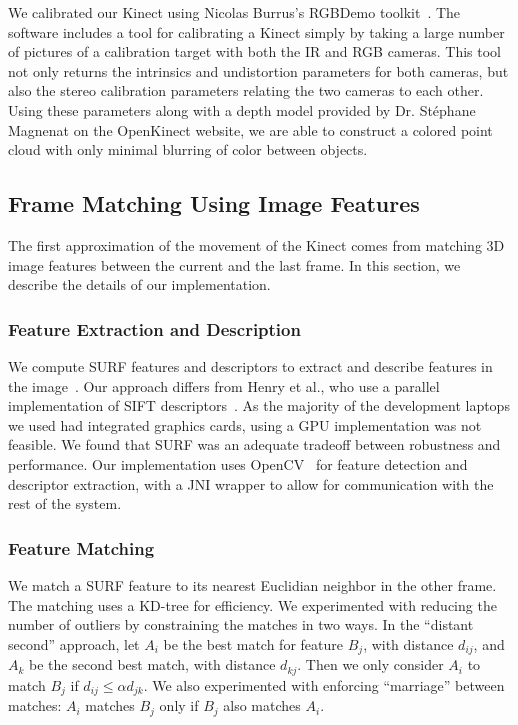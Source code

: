 \documentclass[letterpaper, 10pt, conference]{ieeeconf}
\begin{document}
We calibrated our Kinect using Nicolas Burrus's RGBDemo
toolkit~\cite{BurrusCalibration}. The software includes a tool for calibrating
a Kinect simply by taking a large number of pictures of a calibration target
with both the IR and RGB cameras. This tool not only returns the intrinsics
and undistortion parameters for both cameras, but also the stereo calibration
parameters relating the two cameras to each other. Using these parameters
along with a depth model provided by Dr. St\'{e}phane Magnenat on the
OpenKinect website, we are able to construct a colored point cloud with only
minimal blurring of color between objects.

\subsection{Frame Matching Using Image Features}
The first approximation of the movement of the Kinect comes from matching 3D image
features between the current and the last frame. In this section, we describe the details
of our implementation.

\subsubsection{Feature Extraction and Description}
We compute SURF features and descriptors
to extract and describe features in the image~\cite{Bay06surf}. Our approach differs
from Henry et al., who use a parallel implementation of SIFT descriptors~\cite{SIFTGPU}.
As the majority of the development laptops we used had integrated graphics cards, using
a GPU implementation was not feasible. We found that SURF was an adequate tradeoff
between robustness and performance. Our implementation uses OpenCV~\cite{opencv_library}
for feature detection and descriptor extraction, with a JNI wrapper to allow for
communication with the rest of the system.

\subsubsection{Feature Matching}
We match a SURF feature to its nearest Euclidian neighbor in the other frame. The matching
uses a KD-tree for efficiency. We experimented with reducing the number of outliers by
constraining the matches in two ways. In the ``distant second'' approach, let $A_i$ be the
best match for feature $B_j$, with distance $d_{ij}$, and $A_k$ be the second best match,
with distance $d_{kj}$. Then we only consider $A_i$ to match $B_j$ if $d_{ij} \le \alpha d_{jk}$.
We also experimented with enforcing ``marriage'' between matches: $A_i$ matches $B_j$ only if
$B_j$ also matches $A_i$.
\end{document}
